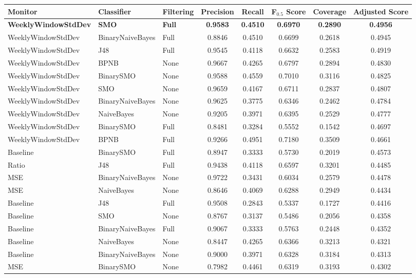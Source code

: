 {
   \footnotesize
   \setlength{\LTleft}{-20cm plus -1fill}
   \setlength{\LTright}{\LTleft}
   \begin{longtable}{|l|l|l|c|c|c|c|c|}
      \hline
         Monitor & Classifier & Filtering & Precision & Recall & F$_{0.5}$ Score & Coverage & Adjusted Score
      \tabularnewline\hline
      \endhead
         \textbf{WeeklyWindowStdDev} & \textbf{SMO} & \textbf{Full} & \textbf{0.9583} & \textbf{0.4510} & \textbf{0.6970} & \textbf{0.2890} & \textbf{0.4956}
      \tabularnewline\hline
         WeeklyWindowStdDev & BinaryNaiveBayes & Full & 0.8846 & 0.4510 & 0.6699 & 0.2618 & 0.4945
      \tabularnewline\hline
         WeeklyWindowStdDev & J48 & Full & 0.9545 & 0.4118 & 0.6632 & 0.2583 & 0.4919
      \tabularnewline\hline
         WeeklyWindowStdDev & BPNB & None & 0.9667 & 0.4265 & 0.6797 & 0.2894 & 0.4830
      \tabularnewline\hline
         WeeklyWindowStdDev & BinarySMO & None & 0.9588 & 0.4559 & 0.7010 & 0.3116 & 0.4825
      \tabularnewline\hline
         WeeklyWindowStdDev & SMO & None & 0.9659 & 0.4167 & 0.6711 & 0.2837 & 0.4807
      \tabularnewline\hline
         WeeklyWindowStdDev & BinaryNaiveBayes & None & 0.9625 & 0.3775 & 0.6346 & 0.2462 & 0.4784
      \tabularnewline\hline
         WeeklyWindowStdDev & NaiveBayes & None & 0.9205 & 0.3971 & 0.6395 & 0.2529 & 0.4777
      \tabularnewline\hline
         WeeklyWindowStdDev & BinarySMO & Full & 0.8481 & 0.3284 & 0.5552 & 0.1542 & 0.4697
      \tabularnewline\hline
         WeeklyWindowStdDev & BPNB & Full & 0.9266 & 0.4951 & 0.7180 & 0.3509 & 0.4661
      \tabularnewline\hline
         Baseline & BinarySMO & Full & 0.8947 & 0.3333 & 0.5730 & 0.2019 & 0.4573
      \tabularnewline\hline
         Ratio & J48 & Full & 0.9438 & 0.4118 & 0.6597 & 0.3201 & 0.4485
      \tabularnewline\hline
         MSE & BinaryNaiveBayes & None & 0.9722 & 0.3431 & 0.6034 & 0.2579 & 0.4478
      \tabularnewline\hline
         MSE & NaiveBayes & None & 0.8646 & 0.4069 & 0.6288 & 0.2949 & 0.4434
      \tabularnewline\hline
         Baseline & J48 & Full & 0.9508 & 0.2843 & 0.5337 & 0.1727 & 0.4416
      \tabularnewline\hline
         Baseline & SMO & None & 0.8767 & 0.3137 & 0.5486 & 0.2056 & 0.4358
      \tabularnewline\hline
         Baseline & BinaryNaiveBayes & Full & 0.9067 & 0.3333 & 0.5763 & 0.2448 & 0.4352
      \tabularnewline\hline
         Baseline & NaiveBayes & None & 0.8447 & 0.4265 & 0.6366 & 0.3213 & 0.4321
      \tabularnewline\hline
         Baseline & BinaryNaiveBayes & None & 0.9000 & 0.3971 & 0.6328 & 0.3184 & 0.4313
      \tabularnewline\hline
         MSE & BinarySMO & None & 0.7982 & 0.4461 & 0.6319 & 0.3193 & 0.4302

\end{longtable}}
